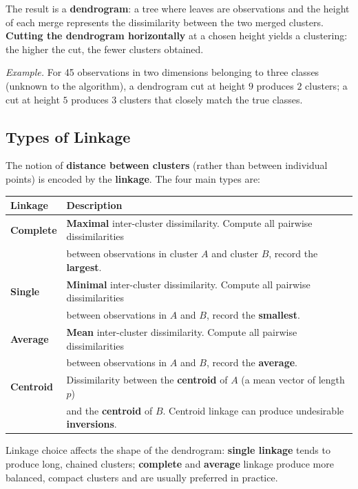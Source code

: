 \documentclass[11pt,a4paper]{article}
\theoremstyle{definition}
\theoremstyle{plain}
\theoremstyle{remark}
\begin{document}
The result is a \textbf{dendrogram}: a tree where leaves are observations and the height of each merge represents the dissimilarity between the two merged clusters. \textbf{Cutting the dendrogram horizontally} at a chosen height yields a clustering: the higher the cut, the fewer clusters obtained.

\textit{Example.} For 45 observations in two dimensions belonging to three classes (unknown to the algorithm), a dendrogram cut at height $9$ produces $2$ clusters; a cut at height $5$ produces $3$ clusters that closely match the true classes.

\subsection{Types of Linkage}

The notion of \textbf{distance between clusters} (rather than between individual points) is encoded by the \textbf{linkage}. The four main types are:

\begin{center}
\begin{tabular}{ll}
\hline
Linkage & Description \\
\hline
\textbf{Complete}  & \textbf{Maximal} inter-cluster dissimilarity. Compute all pairwise dissimilarities \\
                   & between observations in cluster $A$ and cluster $B$, record the \textbf{largest}. \\
\textbf{Single}    & \textbf{Minimal} inter-cluster dissimilarity. Compute all pairwise dissimilarities \\
                   & between observations in $A$ and $B$, record the \textbf{smallest}. \\
\textbf{Average}   & \textbf{Mean} inter-cluster dissimilarity. Compute all pairwise dissimilarities \\
                   & between observations in $A$ and $B$, record the \textbf{average}. \\
\textbf{Centroid}  & Dissimilarity between the \textbf{centroid} of $A$ (a mean vector of length $p$) \\
                   & and the \textbf{centroid} of $B$. Centroid linkage can produce undesirable \textbf{inversions}. \\
\hline
\end{tabular}
\end{center}

Linkage choice affects the shape of the dendrogram: \textbf{single linkage} tends to produce long, chained clusters; \textbf{complete} and \textbf{average} linkage produce more balanced, compact clusters and are usually preferred in practice.
\end{document}
